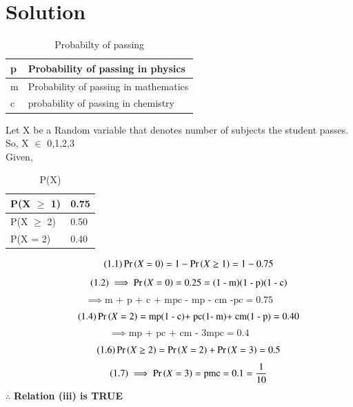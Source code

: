 \documentclass[journal,12pt,twocolumn]{IEEEtran}
\begin{document}
\section{\textbf{Solution}}
\begin{table}[h]
\begin{tabular}{|l|l|}
\hline
p & Probability of passing in physics     \\ \hline
m & Probability of passing in mathematics \\ \hline
c & probability of passing in chemistry   \\ \hline
\end{tabular}
\caption{Probabilty of passing}
\end{table}
Let X be a Random variable that denotes number of subjects the student passes. \\
So, X $\in$ {0,1,2,3} \\
Given,
\begin{table}[h]
\centering
\begin{tabular}{|l|l|}
\hline
P(X $\ge$ 1) & 0.75 \\ \hline
P(X $\ge$ 2) & 0.50 \\ \hline
P(X = 2)   & 0.40 \\ \hline
\end{tabular}
\caption{P(X)}
\end{table}
\begin{equation}
\tag{1.1}
\Pr\left(X = 0\right)  = 1 - \Pr\left(X \ge 1\right) = 1 - 0.75 \label{1} 
\end{equation}
\begin{equation}
    \tag{1.2}
\implies \Pr\left(X = 0\right) = 0.25= \text{(1 - m)(1 - p)(1 - c)}
\end{equation}
\begin{equation}
    \tag{1.3}
    \implies \text{m + p + c  + mpc - mp - cm -pc} = 0.75 \label{X = 0}
\end{equation}
\begin{equation}
    \tag{1.4}
\Pr\left(X = 2\right) = \text{mp(1 - c)+ pc(1- m)+ cm(1 - p)} = 0.40
\end{equation}
\begin{equation}
\tag{1.5}
    \implies \text{mp + pc + cm - 3mpc} = 0.4 \label{X = 2}
\end{equation}
\begin{equation}
    \tag{1.6}
    \Pr\left(X \ge 2\right) = \Pr\left(X = 2\right) + \Pr\left(X = 3\right) = 0.5 
\end{equation}
\begin{equation}
\tag{1.7}
    \implies \Pr\left(X = 3\right) = \text{pmc} = 0.1 = \frac{1}{10} \label{X = 3}
\end{equation}
\vspace{0.1cm}
$\therefore$ \textbf{Relation (iii) is TRUE}
\end{document}
